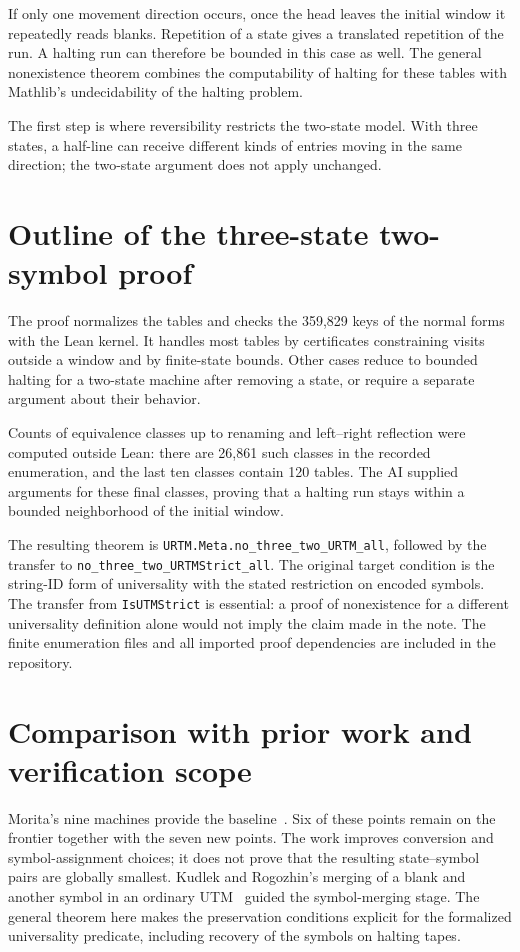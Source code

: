 If only one movement direction occurs, once the head leaves the initial
window it repeatedly reads blanks. Repetition of a state gives a translated
repetition of the run. A halting run can therefore be bounded in this case
as well. The general nonexistence theorem combines the computability of
halting for these tables with Mathlib's undecidability of the halting problem.

The first step is where reversibility restricts the two-state model. With
three states, a half-line can receive different kinds of entries moving in
the same direction; the two-state argument does not apply unchanged.

\section{Outline of the three-state two-symbol proof}

The proof normalizes the tables and checks the 359,829 keys of the normal
forms with the Lean kernel. It handles most tables by certificates constraining visits
outside a window and by finite-state bounds. Other cases reduce to bounded
halting for a two-state machine after removing a state, or require a
separate argument about their behavior.

Counts of equivalence classes up to renaming and left--right reflection
were computed outside Lean: there are 26,861 such classes in the recorded
enumeration, and the last ten classes contain 120 tables. The AI supplied
arguments for these final classes, proving that a halting run stays within
a bounded neighborhood of the initial window.

{\raggedright The resulting theorem is
\texttt{URTM.Meta.no\_three\_two\_URTM\_all}, followed by the transfer to
\texttt{no\_three\_two\_URTMStrict\_all}. The original target condition is
the string-ID form of universality with the stated restriction on encoded
symbols. The transfer from \texttt{IsUTMStrict} is essential: a proof of
nonexistence for a different universality definition alone would not imply
the claim made in the note. The finite enumeration files and all imported
proof dependencies are included in the repository.\par}

\section{Comparison with prior work and verification scope}

Morita's nine machines provide the baseline~\cite{Morita17}. Six of these
points remain on the frontier together with the seven new points. The work
improves conversion and symbol-assignment choices; it does not prove that
the resulting state--symbol pairs are globally smallest.
Kudlek and Rogozhin's merging of a blank and another symbol in an ordinary
UTM~\cite{KudlekRogozhin02} guided the symbol-merging stage. The general
theorem here makes the preservation conditions explicit for the formalized
universality predicate, including recovery of the symbols on halting tapes.

